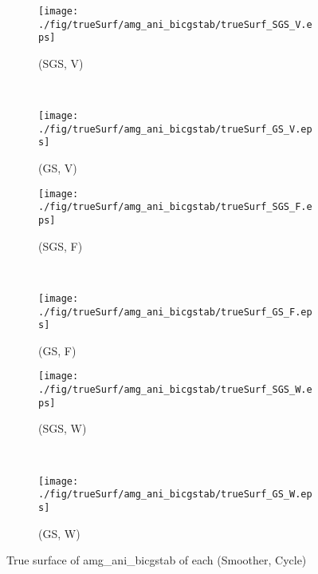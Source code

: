 \begin{figure}
  \centering
  \begin{subfigure}[h]{0.45\textwidth}
    \texttt{[image: ./fig/trueSurf/amg\_ani\_bicgstab/trueSurf\_SGS\_V.eps]}
    \caption{(SGS, V)}
  \end{subfigure}
  ~
  \begin{subfigure}[h]{0.45\textwidth}
    \texttt{[image: ./fig/trueSurf/amg\_ani\_bicgstab/trueSurf\_GS\_V.eps]}
    \caption{(GS, V)}
  \end{subfigure}
  
  \begin{subfigure}[h]{0.45\textwidth}
    \texttt{[image: ./fig/trueSurf/amg\_ani\_bicgstab/trueSurf\_SGS\_F.eps]}
    \caption{(SGS, F)}
  \end{subfigure}
  ~
  \begin{subfigure}[h]{0.45\textwidth}
    \texttt{[image: ./fig/trueSurf/amg\_ani\_bicgstab/trueSurf\_GS\_F.eps]}
    \caption{(GS, F)}
  \end{subfigure}
  
  \begin{subfigure}[h]{0.45\textwidth}
    \texttt{[image: ./fig/trueSurf/amg\_ani\_bicgstab/trueSurf\_SGS\_W.eps]}
    \caption{(SGS, W)}
  \end{subfigure}
  ~
  \begin{subfigure}[h]{0.45\textwidth}
    \texttt{[image: ./fig/trueSurf/amg\_ani\_bicgstab/trueSurf\_GS\_W.eps]}
    \caption{(GS, W)}
  \end{subfigure}
  \caption{True surface of amg\_ani\_bicgstab of each (Smoother, Cycle)}\label{fig:trueSurf_amg_ani_bicgstab}
\end{figure}

